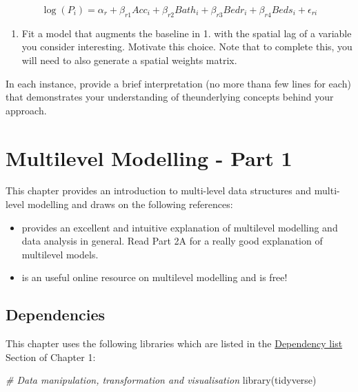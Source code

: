 \documentclass[
]{book}
\newenvironment{Shaded}{\begin{snugshade}}{\end{snugshade}}
\newcommand{\CommentTok}[1]{\textcolor[rgb]{0.56,0.35,0.01}{\textit{#1}}}
\newcommand{\FunctionTok}[1]{\textcolor[rgb]{0.00,0.00,0.00}{#1}}
\newcommand{\NormalTok}[1]{#1}
\providecommand{\tightlist}{%
  \setlength{\itemsep}{0pt}\setlength{\parskip}{0pt}}
\begin{document}
\[
\log(P_i) = \alpha_r + \beta_{r1} Acc_i + \beta_{r2} Bath_i + \beta_{r3} Bedr_i + \beta_{r4} Beds_i + \epsilon_{ri}
\]

\begin{enumerate}
\def\labelenumi{\arabic{enumi}.}
\setcounter{enumi}{3}
\tightlist
\item
  Fit a model that augments the baseline in 1. with the spatial lag of a variable you consider interesting. Motivate this choice. Note that to complete this, you will need to also generate a spatial weights matrix.
\end{enumerate}

In each instance, provide a brief interpretation (no more thana few lines for each) that demonstrates your understanding of theunderlying concepts behind your approach.

\hypertarget{mlm1}{%
\chapter{Multilevel Modelling - Part 1}\label{mlm1}}

This chapter provides an introduction to multi-level data structures and multi-level modelling and draws on the following references:

\begin{itemize}
\tightlist
\item
  \citet{Gelman_Hill_2006_book} provides an excellent and intuitive explanation of multilevel modelling and data analysis in general. Read Part 2A for a really good explanation of multilevel models.
\item
  \citet{bristol2020} is an useful online resource on multilevel modelling and is free!
\end{itemize}

\hypertarget{dependencies-4}{%
\section{Dependencies}\label{dependencies-4}}

This chapter uses the following libraries which are listed in the \protect\hyperlink{dependency-list}{Dependency list} Section of Chapter 1:

\begin{Shaded}
\begin{Highlighting}[]
\CommentTok{\# Data manipulation, transformation and visualisation}
\FunctionTok{library}\NormalTok{(tidyverse)}
\end{Highlighting}
\end{Shaded}
\end{document}

